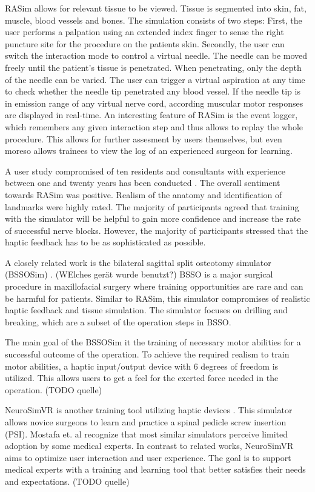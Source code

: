 RASim allows for relevant tissue to be viewed.
Tissue is segmented into skin, fat, muscle, blood vessels and bones.
The simulation consists of two steps: First, the user performs a palpation using an extended index finger to sense the right puncture site for the procedure on the patients skin.
Secondly, the user can switch the interaction mode to control a virtual needle.
The needle can be moved freely until the patient's tissue is penetrated.
When penetrating, only the depth of the needle can be varied.
The user can trigger a virtual aspiration at any time to check whether the needle tip penetrated any blood vessel.
If the needle tip is in emission range of any virtual nerve cord, according muscular motor responses are displayed in real-time.
An interesting feature of RASim is the event logger, which remembers any given interaction step and thus allows to replay the whole procedure.
This allows for further assesment by users themselves, but even moreso allows trainees to view the log of an experienced surgeon for learning.

A user study compromised of ten residents and consultants with experience between one and twenty years has been conducted \cite{RN72}.
The overall sentiment towards RASim was positive. Realism of the anatomy and identification of landmarks were highly rated. 
The majority of participants agreed that training with the simulator will be helpful to gain more confidence and increase the rate of successful nerve blocks.
However, the majority of participants stressed that the haptic feedback has to be as sophisticated as possible.

A closely related work is the bilateral sagittal split osteotomy simulator (BSSOSim) \cite{RN69}.
(WElches gerät wurde benutzt?)
BSSO is a major surgical procedure in maxillofacial surgery where training opportunities are rare and can be harmful for patients.
Similar to RASim, this simulator compromises of realistic haptic feedback and tissue simulation.
The simulator focuses on drilling and breaking, which are a subset of the operation steps in BSSO.

The main goal of the BSSOSim it the training of necessary motor abilities for a successful outcome of the operation.
To achieve the required realism to train motor abilities, a haptic input/output device with 6 degrees of freedom is utilized.
This allows users to get a feel for the exerted force needed in the operation. (TODO quelle)

NeuroSimVR is another training tool utilizing haptic devices \cite{RN71}.
This simulator allows novice surgeons to learn and practice a spinal pedicle screw insertion (PSI).
Mostafa et. al recognize that most similar simulators perceive limited adoption by some medical experts.
In contrast to related works, NeuroSimVR aims to optimize user interaction and user experience.
The goal is to support medical experts with a training and learning tool that better satisfies their needs and expectations. (TODO quelle)

